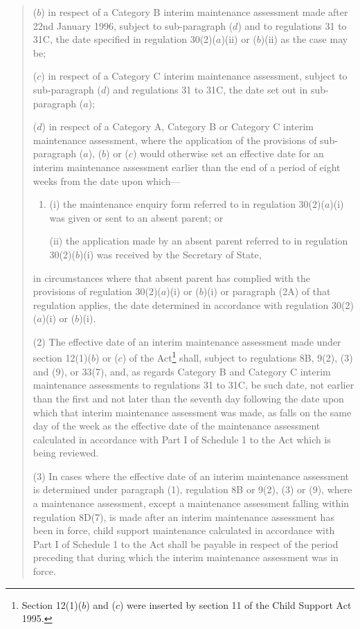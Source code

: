 \documentclass[a4paper]{article}
\begin{document}
\begin{quotation}
\begin{enumerate}
($b$) in respect of a Category B interim maintenance assessment made after 22nd January 1996, subject to sub-paragraph ($d$) and to regulations 31 to 31C, the date specified in regulation 30(2)($a$)(ii) or ($b$)(ii) as the case may be;

($c$) in respect of a Category C interim maintenance assessment, subject to sub-paragraph ($d$) and regulations 31 to 31C, the date set out in sub-paragraph ($a$);

($d$) in respect of a Category A, Category B or Category C interim maintenance assessment, where the application of the provisions of sub-paragraph ($a$), ($b$) or ($c$) would otherwise set an effective date for an interim maintenance assessment earlier than the end of a period of eight weeks from the date upon which—
\begin{enumerate}\item[]
(i) the maintenance enquiry form referred to in regulation 30(2)($a$)(i) was given or sent to an absent parent; or

(ii) the application made by an absent parent referred to in regulation 30(2)($b$)(i) was received by the Secretary of State,
\end{enumerate}
in circumstances where that absent parent has complied with the provisions of regulation 30(2)($a$)(i) or ($b$)(i) or paragraph (2A) of that regulation applies, the date determined in accordance with regulation 30(2)($a$)(i) or ($b$)(i).
\end{enumerate}

(2) The effective date of an interim maintenance assessment made under section 12(1)($b$) or ($c$) of the Act\footnote{\frenchspacing Section 12(1)($b$) and ($c$) were inserted by section 11 of the Child Support Act 1995.} shall, subject to regulations 8B, 9(2), (3) and (9), or 33(7), and, as regards Category B and Category C interim maintenance assessments to regulations 31 to 31C, be such date, not earlier than the first and not later than the seventh day following the date upon which that interim maintenance assessment was made, as falls on the same day of the week as the effective date of the maintenance assessment calculated in accordance with Part I of Schedule 1 to the Act which is being reviewed.

(3) In cases where the effective date of an interim maintenance assessment is determined under paragraph (1), regulation 8B or 9(2), (3) or (9), where a maintenance assessment, except a maintenance assessment falling within regulation 8D(7), is made after an interim maintenance assessment has been in force, child support maintenance calculated in accordance with Part I of Schedule 1 to the Act shall be payable in respect of the period preceding that during which the interim maintenance assessment was in force.


\end{quotation}
\end{document}
